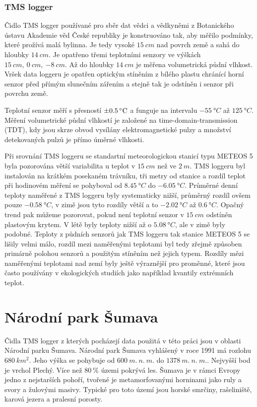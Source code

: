 \subsubsection{TMS logger}
Čidlo TMS logger používané pro sběr dat vědci a vědkyněmi z Botanického ústavu Akademie věd České republiky je konstruováno tak, aby měřilo podmínky, které prožívá malá bylinna. Je tedy vysoké $\SI{15}{cm}$ nad povrch země a sahá do hloubky $\SI{14}{cm}$. Je opatřeno třemi teplotními senzory ve výškách $\SI{15}{cm},\ \SI{0}{cm},\ \SI{-8}{cm}$. Až do hloubky $\SI{14}{cm}$ je měřena volumetrická půdní vlhkost. Vršek data loggeru je opatřen optickým stíněním z bílého plastu chránící horní senzor před přímým slunečním zářením a stejně tak je odstíněn i senzor při povrchu země. 

Teplotní senzor měří s přesností $\SI{\pm 0.5}{\degree C}$ a funguje na intervalu $\SI{-55}{\degree C}$ až $\SI{125}{\degree C}$. Měření volumetrické půdní vlhkostí je založené na time-domain-transmission (TDT), kdy jsou skrze obvod vysílány elektromagnetické pulzy a množství detekovaných pulzů je přímo úměrné vlhkosti. 

Při srovnání TMS loggeru se standartní meteorologickou stanicí typu METEOS 5 byla pozorována větší variabilita u teplot v $\SI{15}{cm}$ než ve $\SI{2}{m}$. TMS loggeru byl instalován na krátkém posekaném trávníku, tři metry od stanice a rozdíl teplot při hodinovém měření se pohyboval od $\SI{+8.45}{\degree C}$ do $\SI{-6.05}{\degree C}$. Průměrné denní teploty naměřené z TMS loggeru byly systematicky nižší, průměrný rozdíl ovšem pouze $\SI{-0.58}{\degree C}$, v zimě jsou tyto rozdíly větší a to $\SI{-2.02}{\degree C}$ až $\SI{0.6}{\degree C}$. Opačný trend pak můžeme pozorovat, pokud není teplotní senzor v $\SI{15}{cm}$ odstíněn plastovým krytem. V létě byly teploty nižší až o $\SI{5.08}{\degree C}$, ale v zimě byly podobné. Teploty z půdních senzorů jak TMS loggeru tak stanice METEOS 5 se lišily velmi málo, rozdíl mezi naměřenými teplotami byl tedy zřejmě způsoben primárně polohou senzorů a použitým stíněním než jejich typem. Rozdíly mězi naměřenými teplotami nad zemí byly ještě výraznější pro proměnné, které jsou často používány v ekologických studiích jako například kvantily extrémních teplot\cite{WildJan2019Caer}. 

\section{Národní park Šumava} \label{chap:sumavabavorskyles}
Čidla TMS logger z kterých pocházejí data použitá v této práci jsou v oblasti Národní parku Šumava. Národní park Šumava vyhlášený v roce 1991 má rozlohu $\SI{680}{km^2}$. Jeho výška se pohybuje od $\SI{600}{m.\ n.\ m.}$ do $\SI{1378}{m.\ n.\ m.}$. Nejvyšší bod je vrchol Plechý. Více než $\SI{80}{\%}$ územi pokrývá les. Šumava je v rámci Evropy jedno z nejstarších pohoří, tvořené je metamorfovanými horninami jako ruly a svory a žulovými masivy. Typické pro toto území jsou horské smrčiny, rašeliniště, karová jezera a pralesní porosty.

